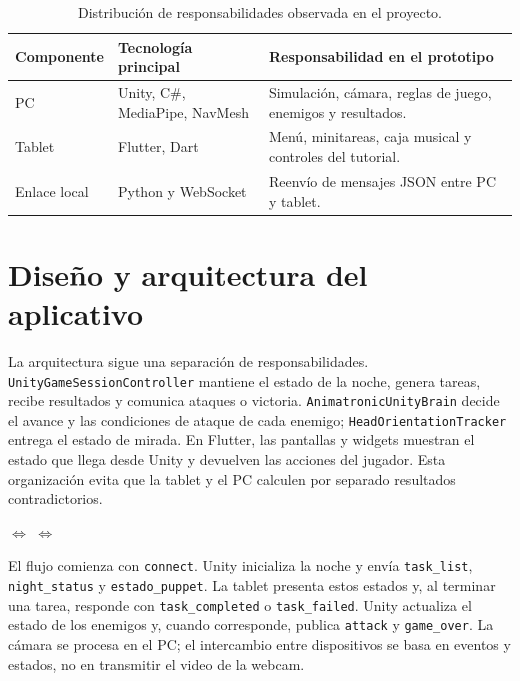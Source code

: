 \documentclass[11pt,a4paper]{article}
\newcommand{\codigo}[1]{\texttt{#1}}
\begin{document}
\begin{table}[ht]
\centering
\small
\begin{tabularx}{\textwidth}{@{}p{2.6cm}X X@{}}
\toprule
Componente & Tecnología principal & Responsabilidad en el prototipo\\
\midrule
PC & Unity, C\#, MediaPipe, NavMesh & Simulación, cámara, reglas de juego, enemigos y resultados.\\
Tablet & Flutter, Dart & Menú, minitareas, caja musical y controles del tutorial.\\
Enlace local & Python y WebSocket & Reenvío de mensajes JSON entre PC y tablet.\\
\bottomrule
\end{tabularx}
\caption{Distribución de responsabilidades observada en el proyecto.}
\end{table}

\section{Diseño y arquitectura del aplicativo}

La arquitectura sigue una separación de responsabilidades. \codigo{UnityGameSessionController} mantiene el estado de la noche, genera tareas, recibe resultados y comunica ataques o victoria. \codigo{AnimatronicUnityBrain} decide el avance y las condiciones de ataque de cada enemigo; \codigo{HeadOrientationTracker} entrega el estado de mirada. En Flutter, las pantallas y widgets muestran el estado que llega desde Unity y devuelven las acciones del jugador. Esta organización evita que la tablet y el PC calculen por separado resultados contradictorios.

\begin{center}
\small
{}
\quad$\Longleftrightarrow$\quad
{}
\quad$\Longleftrightarrow$\quad
{}
\end{center}

El flujo comienza con \codigo{connect}. Unity inicializa la noche y envía \codigo{task\_list}, \codigo{night\_status} y \codigo{estado\_puppet}. La tablet presenta estos estados y, al terminar una tarea, responde con \codigo{task\_completed} o \codigo{task\_failed}. Unity actualiza el estado de los enemigos y, cuando corresponde, publica \codigo{attack} y \codigo{game\_over}. La cámara se procesa en el PC; el intercambio entre dispositivos se basa en eventos y estados, no en transmitir el video de la webcam.
\end{document}
